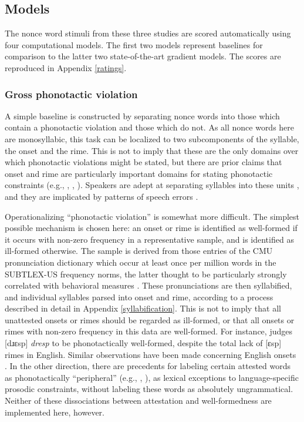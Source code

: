 \subsection{Models}

The nonce word stimuli from these three studies are scored automatically using four computational models. The first two models represent baselines for comparison to the latter two state-of-the-art gradient models. The scores are reproduced in Appendix \ref{ratings}.

\subsubsection{Gross phonotactic violation}

A simple baseline is constructed by separating nonce words into those which contain a phonotactic violation and those which do not. As all nonce words here are monosyllabic, this task can be localized to two subcomponents of the syllable, the onset and the rime. This is not to imply that these are the only domains over which phonotactic violations might be stated, but there are prior claims that onset and rime are particularly important domains for stating phonotactic constraints (e.g., \citealt{Fudge1969}, \citealt{Kessler1997}, \citealt{Treiman2000}). Speakers are adept at separating syllables into these units \citep{Treiman1983,Treiman1986,Treiman1995}, and they are implicated by patterns of speech errors \citep{Fowler1987,Fowler1993}.

Operationalizing ``phonotactic violation'' is somewhat more difficult. The simplest possible mechanism is chosen here: an onset or rime is identified as well-formed if it occurs with non-zero frequency in a representative sample, and is identified as ill-formed otherwise. The sample is derived from those entries of the CMU pronunciation dictionary which occur at least once per million words in the SUBTLEX-US frequency norms, the latter thought to be particularly strongly correlated with behavioral measures \citep{Brysbaert2009}. These pronunciations are then syllabified, and individual syllables parsed into onset and rime, according to a process described in detail in Appendix \ref{syllabification}. This is not to imply that all unattested onsets or rimes should be regarded as ill-formed, or that all onsets or rimes with non-zero frequency in this data are well-formed. For instance, \citet{Albright2009a} judges [dɹɛsp] \emph{dresp} to be phonotactically well-formed, despite the total lack of [ɛsp] rimes in English. Similar observations have been made concerning English onsets \citep[e.g.,][]{Cairns1972,Moreton2002}. In the other direction, there are precedents for labeling certain attested words as phonotactically ``peripheral'' (e.g., \citealt{Myers1987}, \citealt{Borowsky1989}), as lexical exceptions to language-specific prosodic constraints, without labeling these words as absolutely ungrammatical. Neither of these dissociations between attestation and well-formedness are implemented here, however.

